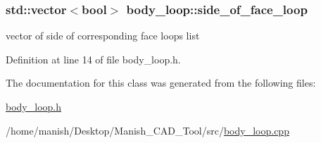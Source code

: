 \subsubsection[{\texorpdfstring{side\+\_\+of\+\_\+face\+\_\+loop}{side_of_face_loop}}]{\setlength{\rightskip}{0pt plus 5cm}std\+::vector$<$bool$>$ body\+\_\+loop\+::side\+\_\+of\+\_\+face\+\_\+loop}\hypertarget{classbody__loop_aa4e8adf7cebc6dc08ff335b71b0b6fa0}{}\label{classbody__loop_aa4e8adf7cebc6dc08ff335b71b0b6fa0}


vector of side of corresponding face loops list 



Definition at line 14 of file body\+\_\+loop.\+h.



The documentation for this class was generated from the following files\+:\begin{DoxyCompactItemize}
\item 
\hyperlink{body__loop_8h}{body\+\_\+loop.\+h}\item 
/home/manish/\+Desktop/\+Manish\+\_\+\+C\+A\+D\+\_\+\+Tool/src/\hyperlink{body__loop_8cpp}{body\+\_\+loop.\+cpp}\end{DoxyCompactItemize}
